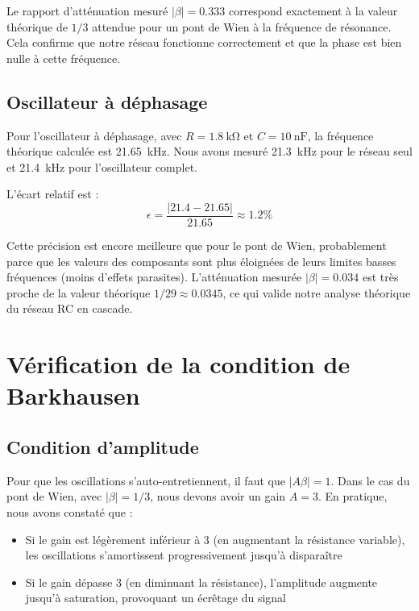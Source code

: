 \documentclass[11pt,a4paper]{report}
\begin{document}
Le rapport d'atténuation mesuré \(|\beta| = 0.333\) correspond exactement à la valeur théorique de \(1/3\) attendue pour un pont de Wien à la fréquence de résonance. Cela confirme que notre réseau fonctionne correctement et que la phase est bien nulle à cette fréquence.

\subsection{Oscillateur à déphasage}

Pour l'oscillateur à déphasage, avec \(R = \SI{1.8}{\kilo\ohm}\) et \(C = \SI{10}{\nano\farad}\), la fréquence théorique calculée est \SI{21.65}{\kilo\hertz}. Nous avons mesuré \SI{21.3}{\kilo\hertz} pour le réseau seul et \SI{21.4}{\kilo\hertz} pour l'oscillateur complet.

L'écart relatif est :
\[
\epsilon = \frac{|21.4 - 21.65|}{21.65} \approx 1.2\%
\]

Cette précision est encore meilleure que pour le pont de Wien, probablement parce que les valeurs des composants sont plus éloignées de leurs limites basses fréquences (moins d'effets parasites). L'atténuation mesurée \(|\beta| = 0.034\) est très proche de la valeur théorique \(1/29 \approx 0.0345\), ce qui valide notre analyse théorique du réseau RC en cascade.

\section{Vérification de la condition de Barkhausen}

\subsection{Condition d'amplitude}

Pour que les oscillations s'auto-entretiennent, il faut que \(|A\beta| = 1\). Dans le cas du pont de Wien, avec \(|\beta| = 1/3\), nous devons avoir un gain \(A = 3\). En pratique, nous avons constaté que :
\begin{itemize}
    \item Si le gain est légèrement inférieur à 3 (en augmentant la résistance variable), les oscillations s'amortissent progressivement jusqu'à disparaître
    \item Si le gain dépasse 3 (en diminuant la résistance), l'amplitude augmente jusqu'à saturation, provoquant un écrêtage du signal
\end{itemize}
\end{document}
